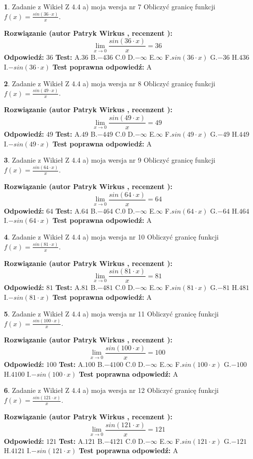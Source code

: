 \documentclass[12pt, a4paper]{article}
\theoremstyle{definition} %
\newtheorem{zad}{}
\newcommand{\zadStart}[1]{\begin{zad}#1\newline}
\newcommand{\zadStop}{\end{zad}}
\newcommand{\rozwStart}[2]{\noindent \textbf{Rozwiązanie (autor #1 , recenzent #2): }\newline}
\newcommand{\rozwStop}{\newline}
\newcommand{\odpStart}{\noindent \textbf{Odpowiedź:}\newline}
\newcommand{\odpStop}{\newline}
\newcommand{\testStart}{\noindent \textbf{Test:}\newline}
\newcommand{\testStop}{\newline}
\newcommand{\kluczStart}{\noindent \textbf{Test poprawna odpowiedź:}\newline}
\newcommand{\kluczStop}{\newline}
\begin{document}
\zadStart{Zadanie z Wikieł Z 4.4 a) moja wersja nr 7}
Obliczyć granicę funkcji $f(x)=\frac{sin(36\cdot x)}{x}$.
\zadStop
\rozwStart{Patryk Wirkus}{}
$$\lim\limits_{x\to 0}\frac{sin(36\cdot x)}{x}=
36$$
\rozwStop
\odpStart
$36$
\odpStop
\testStart
A.$36$
B.$-436$
C.$0$
D.$-\infty$
E.$\infty$
F.$sin(36\cdot x)$
G.$-36$
H.$436$
I.$-sin(36\cdot x)$
\testStop
\kluczStart
A
\kluczStop



\zadStart{Zadanie z Wikieł Z 4.4 a) moja wersja nr 8}
Obliczyć granicę funkcji $f(x)=\frac{sin(49\cdot x)}{x}$.
\zadStop
\rozwStart{Patryk Wirkus}{}
$$\lim\limits_{x\to 0}\frac{sin(49\cdot x)}{x}=
49$$
\rozwStop
\odpStart
$49$
\odpStop
\testStart
A.$49$
B.$-449$
C.$0$
D.$-\infty$
E.$\infty$
F.$sin(49\cdot x)$
G.$-49$
H.$449$
I.$-sin(49\cdot x)$
\testStop
\kluczStart
A
\kluczStop



\zadStart{Zadanie z Wikieł Z 4.4 a) moja wersja nr 9}
Obliczyć granicę funkcji $f(x)=\frac{sin(64\cdot x)}{x}$.
\zadStop
\rozwStart{Patryk Wirkus}{}
$$\lim\limits_{x\to 0}\frac{sin(64\cdot x)}{x}=
64$$
\rozwStop
\odpStart
$64$
\odpStop
\testStart
A.$64$
B.$-464$
C.$0$
D.$-\infty$
E.$\infty$
F.$sin(64\cdot x)$
G.$-64$
H.$464$
I.$-sin(64\cdot x)$
\testStop
\kluczStart
A
\kluczStop



\zadStart{Zadanie z Wikieł Z 4.4 a) moja wersja nr 10}
Obliczyć granicę funkcji $f(x)=\frac{sin(81\cdot x)}{x}$.
\zadStop
\rozwStart{Patryk Wirkus}{}
$$\lim\limits_{x\to 0}\frac{sin(81\cdot x)}{x}=
81$$
\rozwStop
\odpStart
$81$
\odpStop
\testStart
A.$81$
B.$-481$
C.$0$
D.$-\infty$
E.$\infty$
F.$sin(81\cdot x)$
G.$-81$
H.$481$
I.$-sin(81\cdot x)$
\testStop
\kluczStart
A
\kluczStop



\zadStart{Zadanie z Wikieł Z 4.4 a) moja wersja nr 11}
Obliczyć granicę funkcji $f(x)=\frac{sin(100\cdot x)}{x}$.
\zadStop
\rozwStart{Patryk Wirkus}{}
$$\lim\limits_{x\to 0}\frac{sin(100\cdot x)}{x}=
100$$
\rozwStop
\odpStart
$100$
\odpStop
\testStart
A.$100$
B.$-4100$
C.$0$
D.$-\infty$
E.$\infty$
F.$sin(100\cdot x)$
G.$-100$
H.$4100$
I.$-sin(100\cdot x)$
\testStop
\kluczStart
A
\kluczStop



\zadStart{Zadanie z Wikieł Z 4.4 a) moja wersja nr 12}
Obliczyć granicę funkcji $f(x)=\frac{sin(121\cdot x)}{x}$.
\zadStop
\rozwStart{Patryk Wirkus}{}
$$\lim\limits_{x\to 0}\frac{sin(121\cdot x)}{x}=
121$$
\rozwStop
\odpStart
$121$
\odpStop
\testStart
A.$121$
B.$-4121$
C.$0$
D.$-\infty$
E.$\infty$
F.$sin(121\cdot x)$
G.$-121$
H.$4121$
I.$-sin(121\cdot x)$
\testStop
\kluczStart
A
\kluczStop
\end{document}
